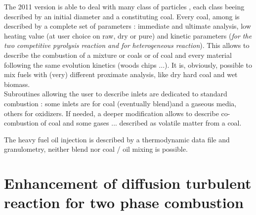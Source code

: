 The 2011 version is able to deal with many class of particles , each
class beeing described by an initial diameter and a constituting coal.  Every
coal, among  is described by a complete set of parameters :
immediate and ultimate analysis, low heating value (at user choice on raw, dry
or pure) and kinetic parameters ({\em for the two competitive pyrolysis reaction
  and for heterogeneous reaction}). This allows to describe the combustion of a
mixture or coals or of coal and every material following the same evolution
kinetics (woods chips ...). It is, obviously, possible to mix fuels with (very)
different proximate analysis, like dry hard coal and wet biomass.\\
Subroutines allowing the user to describe inlets are dedicated to standard
combustion : some inlets are for coal (eventually blend)and a gaseous media,
others for oxidizers. If needed, a deeper modification allows to describe
co-combustion of coal and some gases ... described as volatile matter from a
coal.

The heavy fuel oil injection is described by a thermodynamic data file and
granulometry, neither blend nor coal / oil mixing is possible.

\section*[Diffusion turbulent reaction]{Enhancement of diffusion turbulent reaction for two phase combustion}


